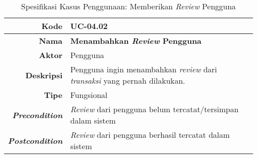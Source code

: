 	
	
	\begin{table}[H]
		\centering
		\caption{Spesifikasi Kasus Penggunaan: Memberikan \textit{Review} Pengguna}
		\label{uc04.02}
		\begin{tabular}{|r|p{8cm}|}
			\hline
			\textbf{Kode}                                                    
			& UC-04.02
			\\ \hline
			\textbf{Nama}                                                    
			& \textbf{ Menambahkan \textit{Review} Pengguna } 
			\\ \hline
			\textbf{Aktor}                                                   
			& Pengguna 
			\\ \hline
			\textbf{Deskripsi}                                               
			& Pengguna ingin menambahkan \textit{review} dari \textit{transaksi} yang pernah dilakukan.
			\\ \hline
			\textbf{Tipe}
			& Fungsional 
			\\ \hline
			
			\textbf{\textit{Precondition}}
			& \textit{Review} dari pengguna belum tercatat/tersimpan dalam sistem \\ \hline
			
			\textbf{\textit{Postcondition}} 
			& \textit{Review} dari pengguna berhasil tercatat dalam sistem
			\\ \hline
			

\end{tabular}
\end{table}
